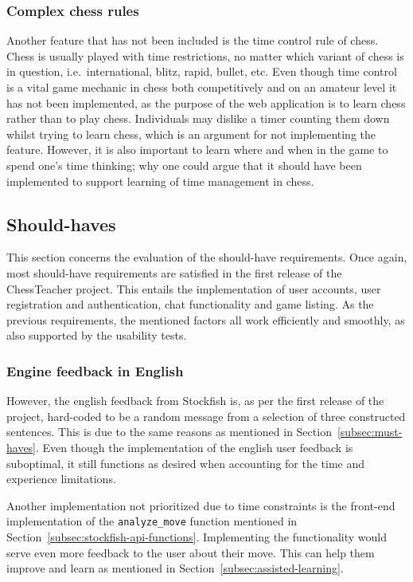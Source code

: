 
\subsubsection{Complex chess rules}

Another feature that has not been included is the time control rule of chess.
Chess is usually played with time restrictions, no matter which variant of chess is in question, i.e.\ international,
blitz, rapid, bullet, etc.
Even though time control is a vital game mechanic in chess both competitively and on an amateur level it has not been
implemented, as the purpose of the web application is to learn chess rather than to play chess.
Individuals may dislike a timer counting them down whilst trying to learn chess, which is an argument for not
implementing the feature.
However, it is also important to learn where and when in the game to spend one's time thinking; why one could argue that
it should have been implemented to support learning of time management in chess.


\subsection{Should-haves}\label{subsec:should-haves}

This section concerns the evaluation of the should-have requirements.
Once again, most should-have requirements are satisfied in the first release of the ChessTeacher
project.
This entails the implementation of user accounts, user registration and authentication, chat functionality and game
listing.
As the previous requirements, the mentioned factors all work efficiently and smoothly,
as also supported by the usability tests.


\subsubsection{Engine feedback in English}

However, the english feedback from Stockfish is, as per the first release of the project, hard-coded to be a random
message from a selection of three constructed sentences.
This is due to the same reasons as mentioned in Section~\ref{subsec:must-haves}.
Even though the implementation of the english user feedback is suboptimal, it still functions as desired when accounting
for the time and experience limitations.

Another implementation not prioritized due to time constraints is the front-end implementation of the
\verb|analyze_move| function mentioned in Section~\ref{subsec:stockfish-api-functions}.
Implementing the functionality would serve even more feedback to the user about their move.
This can help them improve and learn as mentioned in Section~\ref{subsec:assisted-learning}.
